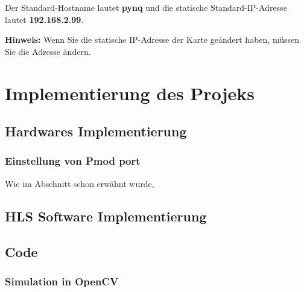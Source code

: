 \documentclass[a4paper]{report}
\begin{document}
Der Standard-Hostname lautet \textbf{pynq} und die statische Standard-IP-Adresse lautet \textbf{192.168.2.99}.

\textbf{Hinweis: } Wenn Sie die statische IP-Adresse der Karte geändert haben, müssen Sie die Adresse ändern. 



\chapter{Implementierung des Projeks}
\label{Implementierung_des_Projeks}


\section{Hardwares Implementierung}

\subsection{Einstellung von Pmod port}
Wie im Abschnitt \textbf{} schon erwähnt wurde, 


\section{HLS Software Implementierung}




\section{Code}

\subsection{Simulation in OpenCV}
\end{document}
